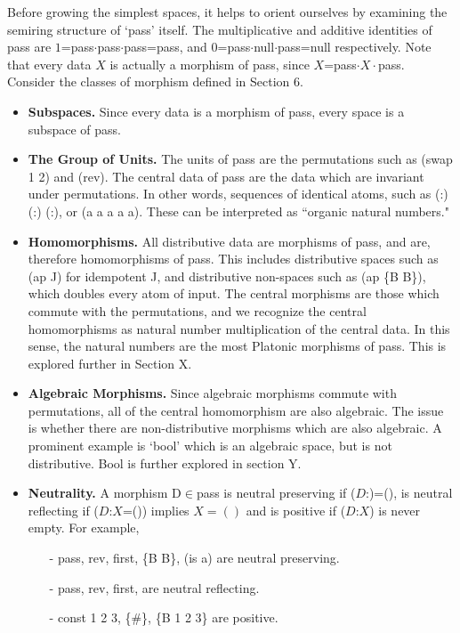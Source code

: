 \documentclass[11pt]{article}
\begin{document}
Before growing the simplest spaces, it helps to orient ourselves by examining the semiring structure of `pass' itself.  The multiplicative and 
additive identities of pass are $1$=pass$\cdot$pass$\cdot$pass=pass, and $0$=pass$\cdot$null$\cdot$pass=null respectively.  Note that every data 
$X$ is actually a morphism of pass, since $X$=pass$\cdot X\cdot$pass.  Consider the classes of morphism defined in Section 6. 
\begin{itemize}
\item{{\bf Subspaces.}  Since every data is a morphism of pass, every space is a subspace of pass.}
\item{{\bf The Group of Units.} The units of pass are the permutations such as (swap 1 2) and (rev).  
The central data of pass are the data which are invariant under permutations.  In other words, sequences of 
identical atoms, such as (:) (:) (:), or (a a a a a).  These can be interpreted as ``organic natural numbers."}
\item{{\bf Homomorphisms.}  All distributive data are morphisms of pass, and are, therefore homomorphisms 
of pass.  This includes distributive spaces such as (ap J) for idempotent J, and distributive non-spaces such as (ap \{B B\}), which doubles 
every atom of input.  The central morphisms are those which commute with the permutations, and we recognize the central homomorphisms as  
natural number multiplication of the central data.  In this sense, the natural numbers are the most Platonic morphisms of pass.  This is explored further in 
Section X.}
\item{{\bf Algebraic Morphisms.} Since algebraic morphisms commute with permutations, all of the central homomorphism are also algebraic.  
The issue is whether there are non-distributive morphisms which are also algebraic.  A prominent example is `bool' which is an algebraic space, but is not 
distributive.  Bool is further explored in section Y.}
\item{{\bf Neutrality.} A morphism D$\in$pass is neutral preserving if ($D$:)=(), is neutral reflecting if ($D$:$X$=()) implies $X=()$ 
and is positive if ($D$:$X$) is never empty.  For example,
\begin{itemize}
\item[-] pass, rev, first, \{B B\}, (is a) are neutral preserving.
\item[-] pass, rev, first, are neutral reflecting.
\item[-] const 1 2 3, \{\#\}, \{B 1 2 3\} are positive. 
\end{itemize}
}
\end{itemize}
\end{document}

